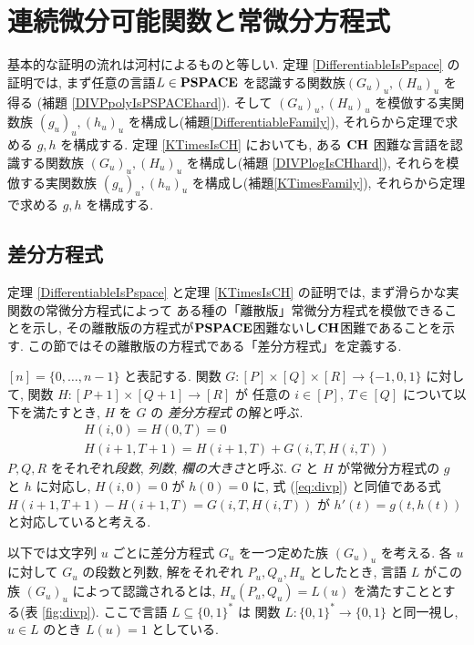 \section{連続微分可能関数と常微分方程式}
\label{section:differentiable}

基本的な証明の流れは河村によるものと等しい\cite{kawamura2010lipschitz}.
定理 \ref{DifferentiableIsPspace} の証明では,
まず任意の言語$L \in \mathbf{PSPACE}$ を認識する関数族$(G_u)_u, (H_u)_u$ を得る
(補題 \ref{DIVPpolyIsPSPACEhard}).
そして $(G_u)_u, (H_u)_u$ を模倣する実関数族 $(g_u)_u, (h_u)_u$ を構成し(補題\ref{DifferentiableFamily}),
それらから定理で求める $g, h$ を構成する.
定理 \ref{KTimesIsCH} においても, ある $\mathbf{CH}$ 困難な言語を認識する関数族
$(G_u)_u, (H_u)_u$ を構成し(補題 \ref{DIVPlogIsCHhard}),
それらを模倣する実関数族 $(g_u)_u, (h_u)_u$ を構成し(補題\ref{KTimesFamily}),
それらから定理で求める $g, h$ を構成する.



\subsection{差分方程式}
\label{section:divp}

定理 \ref{DifferentiableIsPspace} と定理 \ref{KTimesIsCH} の証明では,
まず滑らかな実関数の常微分方程式によって
ある種の「離散版」常微分方程式を模倣できることを示し, 
その離散版の方程式が$\mathbf{PSPACE}$困難ないし$\mathbf{CH}$困難であることを示す.
この節ではその離散版の方程式である「差分方程式」を定義する.

$[n] = \{0, \dots , n-1\}$ と表記する.
関数 $G \colon [P] \times [Q] \times [R] \to \{-1, 0, 1\}$ に対して,
関数 $H \colon [P + 1] \times [Q+1] \to [R]$ が
任意の $i \in [P],\ T \in [Q]$ について以下を満たすとき,
$H$ を $G$ の \emph{差分方程式} の解と呼ぶ.
\begin{gather}
   H(i, 0) = H(0, T) = 0 
\\
   H(i + 1, T + 1) = H(i+1, T) + G(i, T, H(i, T))  \label{eq:divp}
\end{gather}
$P, Q, R$ をそれぞれ\emph{段数}, \emph{列数}, \emph{欄の大きさ}と呼ぶ.
$G$ と $H$ が常微分方程式の $g$ と $h$ に対応し,
$H(i, 0) = 0$ が $h(0) = 0$ に,
式 (\ref{eq:divp}) と同値である式 $H(i + 1, T + 1) - H(i+1, T) = G(i, T, H(i, T))$
が $h'(t) = g(t, h(t))$ と対応していると考える.

以下では文字列 $u$ ごとに差分方程式 $G _u$ を一つ定めた族 $(G _u) _u$ を考える. 
各 $u$ に対して $G_u$ の段数と列数, 解をそれぞれ $P_u, Q_u, H_u$ としたとき,
言語 $L$ がこの族 $(G_u)_u$ によって認識されるとは,
$H_u(P_u, Q_u) = L(u)$ を満たすこととする(表 \ref{fig:divp}).
ここで言語 $L \subseteq \{0, 1\} ^*$ は
関数 $L \colon \{0, 1\} ^* \to \{0, 1\}$ と同一視し, 
$u \in L$ のとき $L (u) = 1$ としている. 


